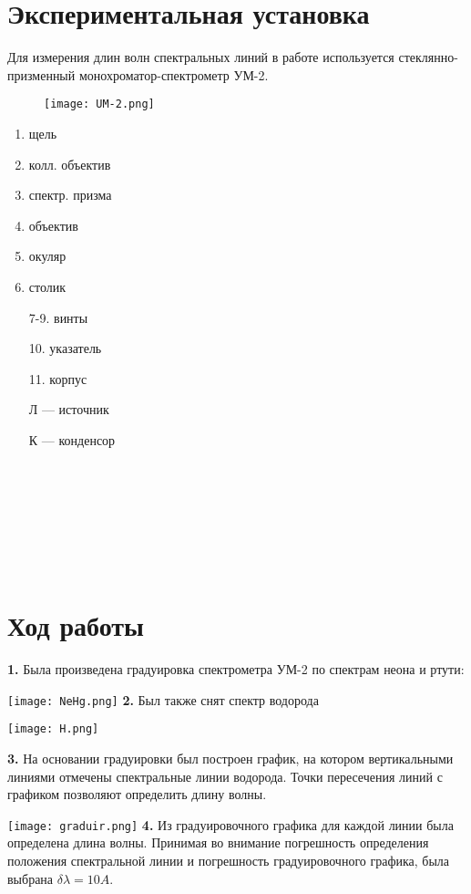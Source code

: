 \documentclass[a4paper,12pt]{article}
\begin{document}
\section{Экспериментальная установка}

Для измерения длин волн спектральных линий в работе используется стеклянно-призменный монохроматор-спектрометр УМ-2.
\begin{wrapfigure}{l}{0.65\linewidth} %
	\texttt{[image: UM-2.png]}
\end{wrapfigure}
\begin{enumerate}
	\item щель
	\item колл. объектив
	\item спектр. призма
	\item объектив
	\item окуляр
	\item столик
	\item [7-9.] винты
	\item[10.] указатель
	\item[11.] корпус
	\item[Л] --- источник
	\item[К] --- конденсор
\end{enumerate}
~\

~\

~\

~\

\newpage

\section{Ход работы}

{\bf 1. } Была произведена градуировка спектрометра УМ-2 по спектрам неона и ртути:

\texttt{[image: NeHg.png]}
\newpage
{\bf 2. } Был также снят спектр водорода 

\texttt{[image: H.png]}

{\bf 3. } На основании градуировки был построен график, на котором вертикальными линиями отмечены спектральные линии водорода. Точки пересечения линий с графиком позволяют определить длину волны.

\texttt{[image: graduir.png]}
\newpage 
{\bf 4. }
Из градуировочного графика для каждой линии была определена длина волны. 
Принимая во внимание погрешность определения положения спектральной линии и погрешность градуировочного графика, была выбрана $\delta \lambda = 10A$.
\end{document}
